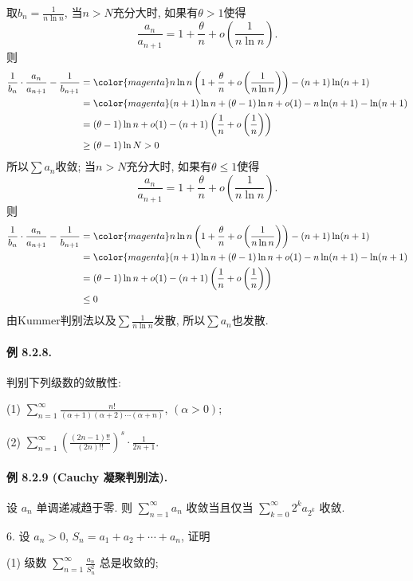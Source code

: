 取$b_{n}=\frac{1}{n\ln n}$, 当$n>N$充分大时, 如果有$\theta>1$使得
\[
\frac{a_{n}}{a_{n+1}}=1+\frac{\theta}{n}+o\left(\frac{1}{n\ln n}\right).
\]
则
\begin{align*}
\frac{1}{b_{n}}\cdot\frac{a_{n}}{a_{n+1}}-\frac{1}{b_{n+1}} & ={\color{magenta}n\ln n\left(1+\frac{\theta}{n}+o\left(\frac{1}{n\ln n}\right)\right)}-(n+1)\ln(n+1)\\
 & ={\color{magenta}(n+1)\ln n+(\theta-1)\ln n+o(1)}-n\ln(n+1)-\ln(n+1)\\
 & =(\theta-1)\ln n+o(1)-(n+1)\left(\frac{1}{n}+o\left(\frac{1}{n}\right)\right)\\
 & \ge(\theta-1)\ln N>0
\end{align*}
所以$\sum a_{n}$收敛; 当$n>N$充分大时, 如果有$\theta\le1$使得
\[
\frac{a_{n}}{a_{n+1}}=1+\frac{\theta}{n}+o\left(\frac{1}{n\ln n}\right).
\]
则
\begin{align*}
\frac{1}{b_{n}}\cdot\frac{a_{n}}{a_{n+1}}-\frac{1}{b_{n+1}} & ={\color{magenta}n\ln n\left(1+\frac{\theta}{n}+o\left(\frac{1}{n\ln n}\right)\right)}-(n+1)\ln(n+1)\\
 & ={\color{magenta}(n+1)\ln n+(\theta-1)\ln n+o(1)}-n\ln(n+1)-\ln(n+1)\\
 & =(\theta-1)\ln n+o(1)-(n+1)\left(\frac{1}{n}+o\left(\frac{1}{n}\right)\right)\\
 & \le0
\end{align*}
由Kummer判别法以及$\sum\frac{1}{n\ln n}$发散, 所以$\sum a_{n}$也发散.

\paragraph{例 8.2.8. }

判别下列级数的敛散性: 

(1) $\sum_{n=1}^{\infty}\frac{n!}{(\alpha+1)(\alpha+2)\cdots(\alpha+n)}$,
$(\alpha>0)$; 

(2) $\sum_{n=1}^{\infty}\left(\frac{(2n-1)!!}{(2n)!!}\right)^{s}\cdot\frac{1}{2n+1}$.

\paragraph{例 8.2.9 (Cauchy 凝聚判别法). }

设 $a_{n}$ 单调递减趋于零. 则 $\sum_{n=1}^{\infty}a_{n}$ 收敛当且仅当 $\sum_{k=0}^{\infty}2^{k}a_{2^{k}}$
收敛.

6. 设 $a_{n}>0$, $S_{n}=a_{1}+a_{2}+\cdots+a_{n}$, 证明 

(1) 级数 $\sum_{n=1}^{\infty}\frac{a_{n}}{S_{n}^{2}}$ 总是收敛的; 

